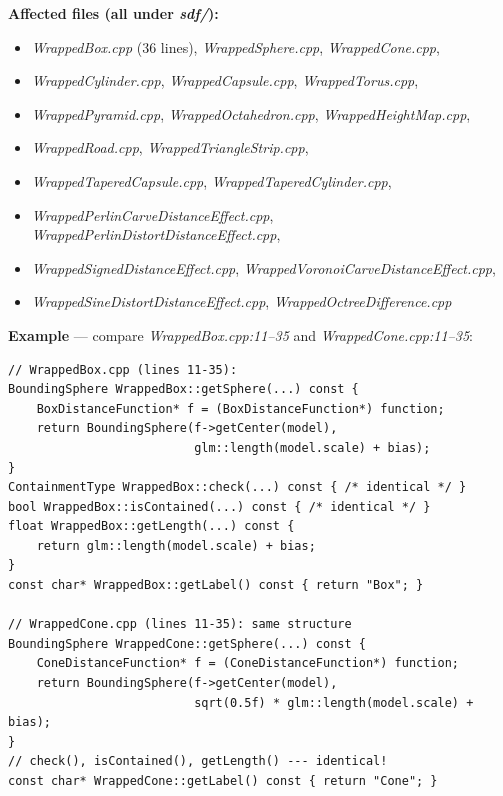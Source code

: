 \documentclass[11pt,a4paper]{article}
\newcommand{\file}[1]{\textsl{#1}}
\begin{document}
\textbf{Affected files (all under \file{sdf/}):}
\begin{itemize}
    \item \file{WrappedBox.cpp} (36 lines), \file{WrappedSphere.cpp}, \file{WrappedCone.cpp},
    \item \file{WrappedCylinder.cpp}, \file{WrappedCapsule.cpp}, \file{WrappedTorus.cpp},
    \item \file{WrappedPyramid.cpp}, \file{WrappedOctahedron.cpp}, \file{WrappedHeightMap.cpp},
    \item \file{WrappedRoad.cpp}, \file{WrappedTriangleStrip.cpp},
    \item \file{WrappedTaperedCapsule.cpp}, \file{WrappedTaperedCylinder.cpp},
    \item \file{WrappedPerlinCarveDistanceEffect.cpp}, \file{WrappedPerlinDistortDistanceEffect.cpp},
    \item \file{WrappedSignedDistanceEffect.cpp}, \file{WrappedVoronoiCarveDistanceEffect.cpp},
    \item \file{WrappedSineDistortDistanceEffect.cpp}, \file{WrappedOctreeDifference.cpp}
\end{itemize}

\textbf{Example} --- compare \file{WrappedBox.cpp:11--35} and \file{WrappedCone.cpp:11--35}:
\begin{lstlisting}
// WrappedBox.cpp (lines 11-35):
BoundingSphere WrappedBox::getSphere(...) const {
    BoxDistanceFunction* f = (BoxDistanceFunction*) function;
    return BoundingSphere(f->getCenter(model),
                          glm::length(model.scale) + bias);
}
ContainmentType WrappedBox::check(...) const { /* identical */ }
bool WrappedBox::isContained(...) const { /* identical */ }
float WrappedBox::getLength(...) const {
    return glm::length(model.scale) + bias;
}
const char* WrappedBox::getLabel() const { return "Box"; }

// WrappedCone.cpp (lines 11-35): same structure
BoundingSphere WrappedCone::getSphere(...) const {
    ConeDistanceFunction* f = (ConeDistanceFunction*) function;
    return BoundingSphere(f->getCenter(model),
                          sqrt(0.5f) * glm::length(model.scale) + bias);
}
// check(), isContained(), getLength() --- identical!
const char* WrappedCone::getLabel() const { return "Cone"; }
\end{lstlisting}
\end{document}
